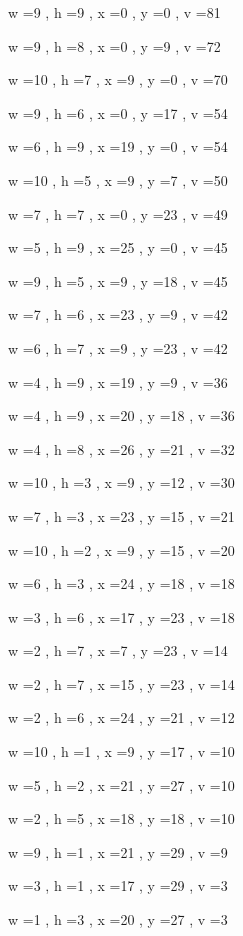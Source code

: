 \documentclass[11pt]{article}
\begin{document}
w =9 , h =9 , x =0 , y =0 , v =81
\par
w =9 , h =8 , x =0 , y =9 , v =72
\par
w =10 , h =7 , x =9 , y =0 , v =70
\par
w =9 , h =6 , x =0 , y =17 , v =54
\par
w =6 , h =9 , x =19 , y =0 , v =54
\par
w =10 , h =5 , x =9 , y =7 , v =50
\par
w =7 , h =7 , x =0 , y =23 , v =49
\par
w =5 , h =9 , x =25 , y =0 , v =45
\par
w =9 , h =5 , x =9 , y =18 , v =45
\par
w =7 , h =6 , x =23 , y =9 , v =42
\par
w =6 , h =7 , x =9 , y =23 , v =42
\par
w =4 , h =9 , x =19 , y =9 , v =36
\par
w =4 , h =9 , x =20 , y =18 , v =36
\par
w =4 , h =8 , x =26 , y =21 , v =32
\par
w =10 , h =3 , x =9 , y =12 , v =30
\par
w =7 , h =3 , x =23 , y =15 , v =21
\par
w =10 , h =2 , x =9 , y =15 , v =20
\par
w =6 , h =3 , x =24 , y =18 , v =18
\par
w =3 , h =6 , x =17 , y =23 , v =18
\par
w =2 , h =7 , x =7 , y =23 , v =14
\par
w =2 , h =7 , x =15 , y =23 , v =14
\par
w =2 , h =6 , x =24 , y =21 , v =12
\par
w =10 , h =1 , x =9 , y =17 , v =10
\par
w =5 , h =2 , x =21 , y =27 , v =10
\par
w =2 , h =5 , x =18 , y =18 , v =10
\par
w =9 , h =1 , x =21 , y =29 , v =9
\par
w =3 , h =1 , x =17 , y =29 , v =3
\par
w =1 , h =3 , x =20 , y =27 , v =3
\par
\newpage


\end{document}
